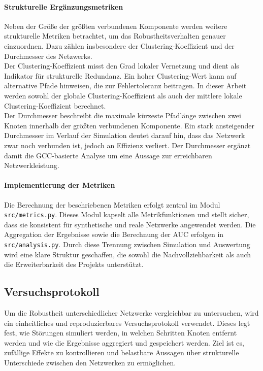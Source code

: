 \documentclass[14pt,a4paper]{scrartcl}
\begin{document}
\paragraph{Strukturelle Ergänzungsmetriken}
Neben der Größe der größten verbundenen Komponente werden weitere
strukturelle Metriken betrachtet, um das Robustheitsverhalten genauer
einzuordnen. Dazu zählen insbesondere der Clustering-Koeffizient und der
Durchmesser des Netzwerks.\\
Der Clustering-Koeffizient misst den Grad lokaler Vernetzung und dient als
Indikator für strukturelle Redundanz. Ein hoher Clustering-Wert kann auf
alternative Pfade hinweisen, die zur Fehlertoleranz beitragen. In dieser Arbeit
werden sowohl der globale Clustering-Koeffizient als auch der mittlere lokale
Clustering-Koeffizient berechnet.\\
Der Durchmesser beschreibt die maximale kürzeste Pfadlänge zwischen zwei
Knoten innerhalb der größten verbundenen Komponente. Ein stark ansteigender
Durchmesser im Verlauf der Simulation deutet darauf hin, dass das Netzwerk zwar
noch verbunden ist, jedoch an Effizienz verliert. Der Durchmesser ergänzt damit
die GCC-basierte Analyse um eine Aussage zur erreichbaren Netzwerkleistung.

\paragraph{Implementierung der Metriken}
Die Berechnung der beschriebenen Metriken erfolgt zentral im Modul
\texttt{src/metrics.py}. Dieses Modul kapselt alle Metrikfunktionen und stellt
sicher, dass sie konsistent für synthetische und reale Netzwerke angewendet
werden. Die Aggregation der Ergebnisse sowie die Berechnung der AUC erfolgen in
\texttt{src/analysis.py}. Durch diese Trennung zwischen Simulation und
Auswertung wird eine klare Struktur geschaffen, die sowohl die
Nachvollziehbarkeit als auch die Erweiterbarkeit des Projekts unterstützt.

\subsection{Versuchsprotokoll}

Um die Robustheit unterschiedlicher Netzwerke vergleichbar zu untersuchen,
wird ein einheitliches und reproduzierbares Versuchsprotokoll verwendet.
Dieses legt fest, wie Störungen simuliert werden, in welchen Schritten Knoten
entfernt werden und wie die Ergebnisse aggregiert und gespeichert werden. Ziel
ist es, zufällige Effekte zu kontrollieren und belastbare Aussagen über
strukturelle Unterschiede zwischen den Netzwerken zu ermöglichen.
\end{document}
